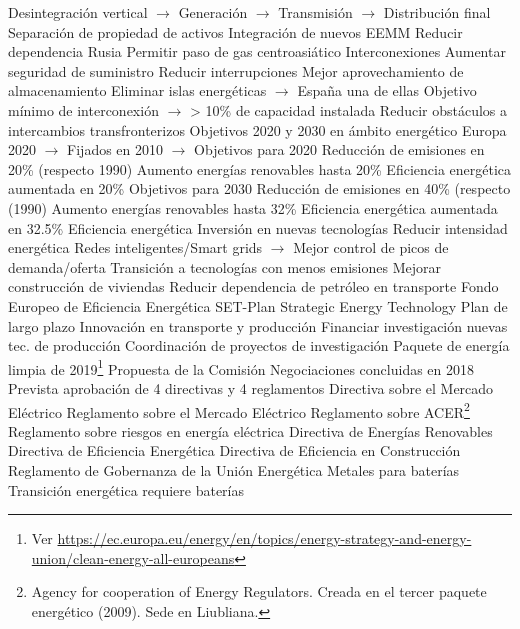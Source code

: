 \documentclass{nuevotema}
\begin{document}
\begin{esquemal}
				\4[] Desintegración vertical
				\4[] $\to$ Generación
				\4[] $\to$ Transmisión
				\4[] $\to$ Distribución final
				\4[] Separación de propiedad de activos
				\4 Integración de nuevos EEMM
				\4[] Reducir dependencia Rusia
				\4[] Permitir paso de gas centroasiático
				\4 Interconexiones
				\4[] Aumentar seguridad de suministro
				\4[] Reducir interrupciones
				\4[] Mejor aprovechamiento de almacenamiento
				\4[] Eliminar islas energéticas
				\4[] $\to$ España una de ellas
				\4[] Objetivo mínimo de interconexión
				\4[] $\to$ > 10\% de capacidad instalada
				\4[] Reducir obstáculos a intercambios transfronterizos
			\3 Objetivos 2020 y 2030 en ámbito energético
				\4 Europa 2020
				\4[] $\to$ Fijados en 2010
				\4[] $\to$ Objetivos para 2020
				\4[] Reducción de emisiones en 20\% (respecto 1990)
				\4[] Aumento energías renovables hasta 20\%
				\4[] Eficiencia energética aumentada en 20\%
				\4 Objetivos para 2030
				\4[] Reducción de emisiones en 40\% (respecto (1990)
				\4[] Aumento energías renovables hasta 32\%
				\4[] Eficiencia energética aumentada en 32.5\%
			\3 Eficiencia energética
				\4 Inversión en nuevas tecnologías
				\4[] Reducir intensidad energética
				\4[] Redes inteligentes/Smart grids
				\4[] $\to$ Mejor control de picos de demanda/oferta
				\4 Transición a tecnologías con menos emisiones
				\4 Mejorar construcción de viviendas
				\4 Reducir dependencia de petróleo en transporte
				\4 Fondo Europeo de Eficiencia Energética
			\3 SET-Plan
				\4 Strategic Energy Technology
				\4[] Plan de largo plazo
				\4[] Innovación en transporte y producción
				\4[] Financiar investigación nuevas tec. de producción
				\4[] Coordinación de proyectos de investigación
			\3 Paquete de energía limpia de 2019\footnote{Ver \url{https://ec.europa.eu/energy/en/topics/energy-strategy-and-energy-union/clean-energy-all-europeans}}
				\4 Propuesta de la Comisión
				\4 Negociaciones concluidas en 2018
				\4 Prevista aprobación de 4 directivas y 4 reglamentos
				\4[1] Directiva sobre el Mercado Eléctrico
				\4[2] Reglamento sobre el Mercado Eléctrico
				\4[3] Reglamento sobre ACER\footnote{Agency for cooperation of Energy Regulators. Creada en el tercer paquete energético (2009). Sede en Liubliana.}
				\4[4] Reglamento sobre riesgos en energía eléctrica
				\4[5] Directiva de Energías Renovables
				\4[6] Directiva de Eficiencia Energética
				\4[7] Directiva de Eficiencia en Construcción
				\4[8] Reglamento de Gobernanza de la Unión Energética
			\3 Metales para baterías
				\4 Transición energética requiere baterías

\end{esquemal}
\end{document}
